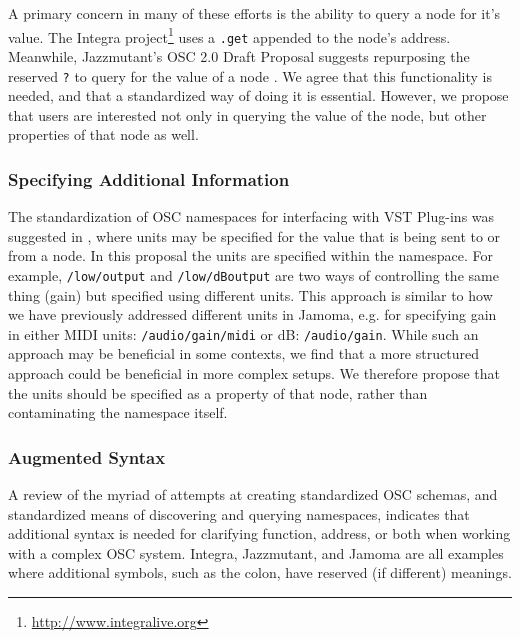 \documentclass{NIME-alternate}
\begin{document}
A primary concern in many of these efforts is the ability to query a node for it's value. The Integra project\footnote{\url{http://www.integralive.org}} uses a \texttt{.get} appended to the node's address.
Meanwhile, Jazzmutant's OSC 2.0 Draft Proposal suggests repurposing the reserved \texttt{?} to query for the value of a node %
\cite{Jazzmutant:2007}. We agree that this functionality is needed, and that a standardized way of doing it is essential.  However, we propose that users are interested not only in querying the value of the node, but other properties of that node as well.

\subsubsection{Specifying Additional Information}
The standardization of OSC namespaces for interfacing with VST Plug-ins was suggested in \cite{Zbyszynski:2005}, where units may be specified for the value that is being sent to or from a node.  In this proposal the units are specified within the namespace.  For example, \texttt{/low/output} and \texttt{/low/dBoutput} are two ways of controlling the same thing (gain) but specified using different units. This approach is similar to how we have previously addressed different units in Jamoma, e.g. for specifying gain in either MIDI units: \texttt{/audio/gain/midi} or dB: \texttt{/audio/gain}. While such an approach may be beneficial in some contexts, we find that a more structured approach could be beneficial in more complex setups. We therefore propose that the units should be specified as a property of that node, rather than contaminating the namespace itself.

\subsubsection{Augmented Syntax}

A review of the myriad of attempts at creating standardized OSC schemas, and standardized means of discovering and querying namespaces, indicates that additional syntax is needed for clarifying function, address, or both when working with a complex OSC system.  Integra, Jazzmutant, and Jamoma are all examples where additional symbols, such as the colon, have reserved (if different) meanings.
\end{document}
